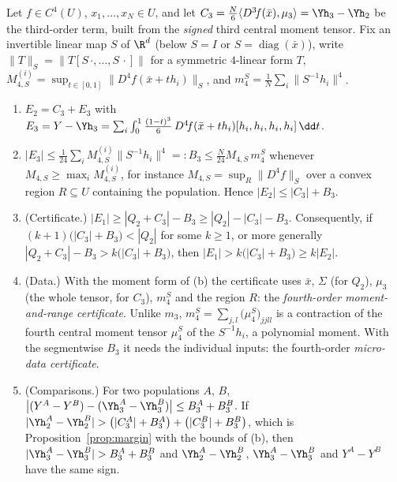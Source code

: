 \begin{proposition}\label{prop:sharp}
Let $f\in C^4(U)$, $x_1,\dots,x_N\in U$, and let $C_3=\frac N6\langle D^3\!f(\bar x),\mu_3\rangle=\Yh_3-\Yh_2$ be the third-order term, built from the \emph{signed} third central moment tensor. Fix an invertible linear map $S$ of $\R^d$ (below $S=I$ or $S=\operatorname{diag}(\bar x)$), write $\|T\|_S=\|T[S\,\cdot,\dots,S\,\cdot]\|$ for a symmetric $4$-linear form $T$, $M_{4,S}^{(i)}=\sup_{t\in[0,1]}\|D^4\!f(\bar x+th_i)\|_S$, and $m_4^S=\frac1N\sum_i\|S^{-1}h_i\|^4$.
\begin{enumerate}[label=(\alph*),leftmargin=2em]
\item $E_2=C_3+E_3$ with $E_3=Y-\Yh_3=\sum_i\int_0^1\frac{(1-t)^3}{6}\,D^4\!f(\bar x+th_i)[h_i,h_i,h_i,h_i]\,\dd t$.
\item $|E_3|\le\frac1{24}\sum_iM_{4,S}^{(i)}\|S^{-1}h_i\|^4=:B_3\le\frac N{24}M_{4,S}\,m_4^S$ whenever $M_{4,S}\ge\max_iM_{4,S}^{(i)}$, for instance $M_{4,S}=\sup_R\|D^4\!f\|_S$ over a convex region $R\subseteq U$ containing the population. Hence $|E_2|\le|C_3|+B_3$.
\item (Certificate.) $|E_1|\ge|Q_2+C_3|-B_3\ge|Q_2|-|C_3|-B_3$. Consequently, if $(k+1)\big(|C_3|+B_3\big)<|Q_2|$ for some $k\ge1$, or more generally $|Q_2+C_3|-B_3>k\big(|C_3|+B_3\big)$, then $|E_1|>k\big(|C_3|+B_3\big)\ge k|E_2|$.
\item (Data.) With the moment form of (b) the certificate uses $\bar x$, $\Sigma$ (for $Q_2$), $\mu_3$ (the whole tensor, for $C_3$), $m_4^S$ and the region $R$: the \emph{fourth-order moment-and-range certificate}. Unlike $m_3$, $m_4^S=\sum_{j,l}\big(\mu_4^S\big)_{jjll}$ is a contraction of the fourth central moment tensor $\mu_4^S$ of the $S^{-1}h_i$, a polynomial moment. With the segmentwise $B_3$ it needs the individual inputs: the fourth-order \emph{micro-data certificate}.
\item (Comparisons.) For two populations $A$, $B$, $\big|(Y^A-Y^B)-(\Yh_3^A-\Yh_3^B)\big|\le B_3^A+B_3^B$. If $|\Yh_2^A-\Yh_2^B|>\big(|C_3^A|+B_3^A\big)+\big(|C_3^B|+B_3^B\big)$, which is Proposition~\ref{prop:margin} with the bounds of (b), then $|\Yh_3^A-\Yh_3^B|>B_3^A+B_3^B$ and $\Yh_2^A-\Yh_2^B$, $\Yh_3^A-\Yh_3^B$ and $Y^A-Y^B$ have the same sign.
\end{enumerate}
\end{proposition}
